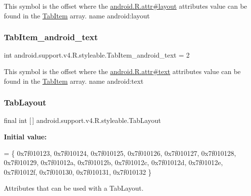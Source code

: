 This symbol is the offset where the \hyperlink{}{android.\+R.\+attr\#layout} attribute\textquotesingle{}s value can be found in the \hyperlink{classandroid_1_1support_1_1v4_1_1R_1_1styleable_ad680ed3459bf81f422f0dcae8c50dfc3}{Tab\+Item} array.  name android\+:layout \mbox{\label{classandroid_1_1support_1_1v4_1_1R_1_1styleable_a4a41f221a6dff9f2540c4311a480ec64}} 
\subsubsection{\texorpdfstring{Tab\+Item\+\_\+android\+\_\+text}{TabItem\_android\_text}}
{\footnotesize\ttfamily int android.\+support.\+v4.\+R.\+styleable.\+Tab\+Item\+\_\+android\+\_\+text = 2\hspace{0.3cm}{\ttfamily [static]}}

This symbol is the offset where the \hyperlink{}{android.\+R.\+attr\#text} attribute\textquotesingle{}s value can be found in the \hyperlink{classandroid_1_1support_1_1v4_1_1R_1_1styleable_ad680ed3459bf81f422f0dcae8c50dfc3}{Tab\+Item} array.  name android\+:text \mbox{\label{classandroid_1_1support_1_1v4_1_1R_1_1styleable_a48e866d7121b40ef0bb3d467759606a9}} 
\subsubsection{\texorpdfstring{Tab\+Layout}{TabLayout}}
{\footnotesize\ttfamily final int \mbox{[}$\,$\mbox{]} android.\+support.\+v4.\+R.\+styleable.\+Tab\+Layout\hspace{0.3cm}{\ttfamily [static]}}

{\bfseries Initial value\+:}
\begin{DoxyCode}
= \{
            0x7f010123, 0x7f010124, 0x7f010125, 0x7f010126,
            0x7f010127, 0x7f010128, 0x7f010129, 0x7f01012a,
            0x7f01012b, 0x7f01012c, 0x7f01012d, 0x7f01012e,
            0x7f01012f, 0x7f010130, 0x7f010131, 0x7f010132
        \}
\end{DoxyCode}
Attributes that can be used with a Tab\+Layout. 

